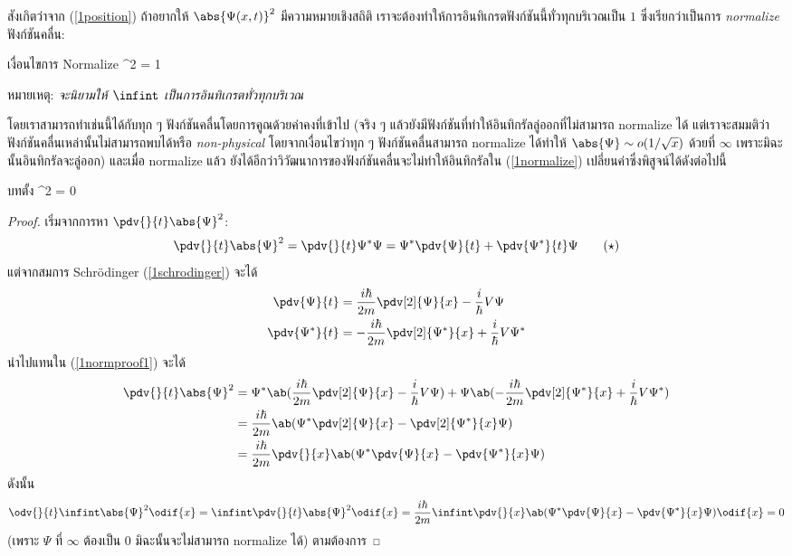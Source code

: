สังเกิตว่าจาก (\ref{1position}) ถ้าอยากให้ $\abs{\Psi(x, t)}^2$ มีความหมายเชิงสถิติ เราจะต้องทำให้การอินทิเกรตฟังก์ชันนี้ทั่วทุกบริเวณเป็น $1$ ซึ่งเรียกว่าเป็นการ \emph{normalize} ฟังก์ชันคลื่น:
\begin{eqbox}{เงื่อนไขการ Normalize}
    \infint{}^2  = 1 \label{1normalize}
\end{eqbox}
หมายเหตุ: \emph{จะนิยามให้ $\infint$ เป็นการอินทิเกรตทั่วทุกบริเวณ}

โดยเราสามารถทำเช่นนี้ได้กับทุก ๆ ฟังก์ชันคลื่นโดยการคูณด้วยค่าคงที่เข้าไป (จริง ๆ แล้วยังมีฟังก์ชันที่ทำให้อินทิกรัลลู่ออกที่ไม่สามารถ normalize ได้ แต่เราจะสมมติว่าฟังก์ชันคลื่นเหล่านั้นไม่สามารถพบได้หรือ \emph{non-physical} โดยจากเงื่อนไขว่าทุก ๆ ฟังก์ชันคลื่นสามารถ normalize ได้ทำให้ $\abs{\Psi} \sim o(1/\sqrt{x})$ ด้วยที่ $\infty$ เพราะมิฉะนั้นอินทิกรัลจะลู่ออก) และเมื่อ normalize แล้ว ยังได้อีกว่าวิวัฒนาการของฟังก์ชันคลื่นจะไม่ทำให้อินทิกรัลใน (\ref{1normalize}) เปลี่ยนค่าซึ่งพิสูจน์ได้ดังต่อไปนี้
\begin{eqbox}{บทตั้ง}
     \infint {}^2  = 0
\end{eqbox}
\begin{proof}
    เริ่มจากการหา $\pdv{}{t}\abs{\Psi}^2$:
    \begin{equation}
        \pdv{}{t}\abs{\Psi}^2 = \pdv{}{t}\Psi^*\Psi = \Psi^*\pdv{\Psi}{t} + \pdv{\Psi^*}{t}\Psi \tag{$\star$}\label{1normproof1}
    \end{equation} 
    แต่จากสมการ Schrödinger (\ref{1schrodinger}) จะได้
    \begin{align*}
        \pdv{\Psi}{t} &= \frac{i\hbar}{2m}\pdv[2]{\Psi}{x} - \frac{i}{\hbar}V\Psi\\
        \pdv{\Psi^*}{t} &= -\frac{i\hbar}{2m}\pdv[2]{\Psi^*}{x} + \frac{i}{\hbar}V\Psi^*
    \end{align*}
    นำไปแทนใน (\ref{1normproof1}) จะได้
    \begin{align}
        \pdv{}{t}\abs{\Psi}^2 &= \Psi^*\ab(\frac{i\hbar}{2m}\pdv[2]{\Psi}{x} - \frac{i}{\hbar}V\Psi) + \Psi\ab(-\frac{i\hbar}{2m}\pdv[2]{\Psi^*}{x} + \frac{i}{\hbar}V\Psi^*) \notag\\
        &= \frac{i\hbar}{2m}\ab(\Psi^*\pdv[2]{\Psi}{x} - \pdv[2]{\Psi^*}{x}\Psi)\notag\\
        &= \frac{i\hbar}{2m}\pdv{}{x}\ab(\Psi^*\pdv{\Psi}{x} - \pdv{\Psi^*}{x}\Psi)\label{1normproof2}
    \end{align}
    ดังนั้น
    \[
    \odv{}{t}\infint\abs{\Psi}^2\odif{x} = \infint\pdv{}{t}\abs{\Psi}^2\odif{x} = \frac{i\hbar}{2m}\infint \pdv{}{x}\ab(\Psi^*\pdv{\Psi}{x} - \pdv{\Psi^*}{x}\Psi)\odif{x} = 0
    \]
    (เพราะ $\Psi$ ที่ $\infty$ ต้องเป็น $0$ มิฉะนั้นจะไม่สามารถ normalize ได้) ตามต้องการ
\end{proof}

